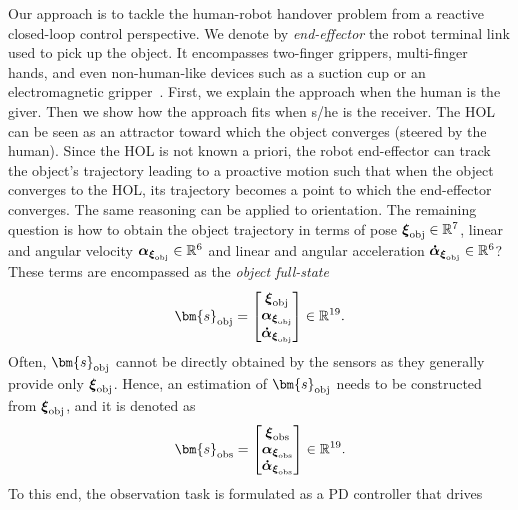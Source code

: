 Our approach is to tackle the human-robot handover problem from a reactive closed-loop control perspective. We denote by \emph{end-effector} the robot terminal link used to pick up the object. It encompasses two-finger grippers, multi-finger hands, and even non-human-like devices such as a suction cup or an electromagnetic gripper~\cite{pan2018haptics}.  	First, we explain the approach when the human is the giver. Then we show how the approach fits when s/he is the receiver. The HOL can be seen as an attractor toward which the object converges (steered by the human). Since the HOL is not known a priori, the robot end-effector can track the object's trajectory leading to a proactive motion such that when the object converges to the HOL, its trajectory becomes a point to which the end-effector converges. The same reasoning can be applied to orientation. The remaining question is how to obtain the object trajectory in terms of pose $\boldsymbol{\xi}_{\rm obj}\in\mathbb{R}^7$, linear and angular velocity $\boldsymbol{\alpha}_{\boldsymbol{\xi}_{\rm obj}}\in\mathbb{R}^6$ and linear and angular acceleration $\boldsymbol{\dot{\alpha}}_{\boldsymbol{\xi}_{\rm obj}}\in\mathbb{R}^6$? These terms are encompassed as the \emph{object full-state} 
\begin{equation}\label{eq:object full-state}
	\bm{s}_{\rm obj}=\begin{bmatrix}
		\boldsymbol{\xi}_{\rm obj}\\ \boldsymbol{\alpha}_{\boldsymbol{\xi}_{\rm obj}} \\ \boldsymbol{\dot{\alpha}}_{\boldsymbol{\xi}_{\rm obj}}
	\end{bmatrix}\in\mathbb{R}^{19}.
\end{equation} 
Often, $\bm{s}_{\rm obj}$ cannot be directly obtained by the sensors as they generally provide only $\boldsymbol{\xi}_{\rm obj}$. Hence, an estimation of $\bm{s}_{\rm obj}$ needs to be constructed from $\boldsymbol{\xi}_{\rm obj}$, and it is denoted as %
\begin{equation}\label{eq:observer full-state}
	\bm{s}_{\rm obs}=\begin{bmatrix}
		\boldsymbol{\xi}_{\rm obs}\\ \boldsymbol{\alpha}_{\boldsymbol{\xi}_{\rm obs}} \\ \boldsymbol{\dot{\alpha}}_{\boldsymbol{\xi}_{\rm obs}}
	\end{bmatrix}\in\mathbb{R}^{19}.
\end{equation}
To this end, the observation task is formulated as a PD controller that drives 
